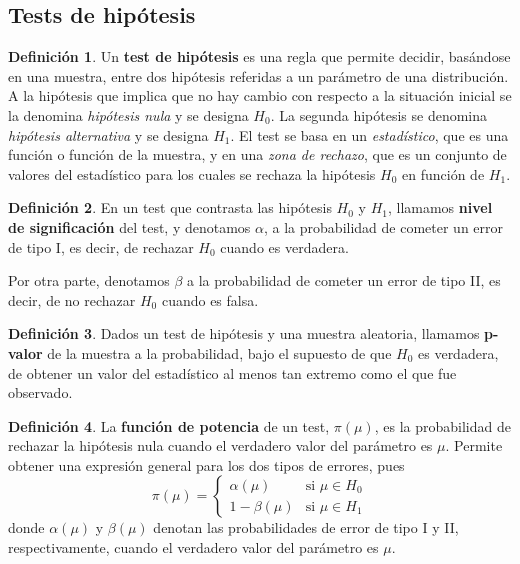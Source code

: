 \documentclass[11pt]{article}
\theoremstyle{plain}
\theoremstyle{definition}
\newtheorem*{defi}{Definición}
\theoremstyle{remark}
\newcommand{\deft}[1]{\textbf{#1}}  %
\begin{document}
  \subsection{Tests de hipótesis}

    \begin{defi}
      Un \deft{test de hipótesis} es una regla que permite decidir, basándose en una muestra, entre dos hipótesis referidas a un parámetro de una distribución. A la hipótesis que implica que no hay cambio con respecto a la situación inicial se la denomina \emph{hipótesis nula} y se designa $H_0$. La segunda hipótesis se denomina \emph{hipótesis alternativa} y se designa $H_1$.
      El test se basa en un \emph{estadístico}, que es una función o función de la muestra, y en una \emph{zona de rechazo}, que es un conjunto de valores del estadístico para los cuales se rechaza la hipótesis $H_0$ en función de $H_1$.
    \end{defi}

    \begin{defi}
      En un test que contrasta las hipótesis $H_0$ y $H_1$, llamamos \deft{nivel de significación} del test, y denotamos $\alpha$, a la probabilidad de cometer un error de tipo I, es decir, de rechazar $H_0$ cuando es verdadera. 

      Por otra parte, denotamos $\beta$ a la probabilidad de cometer un error de tipo II, es decir, de no rechazar $H_0$ cuando es falsa.
    \end{defi}

    \begin{defi}
      Dados un test de hipótesis y una muestra aleatoria, llamamos \deft{p-valor} de la muestra a la probabilidad, bajo el supuesto de que $H_0$ es verdadera, de obtener un valor del estadístico al menos tan extremo como el que fue observado.
    \end{defi}

    \begin{defi}
      La \deft{función de potencia} de un test, $\pi(\mu)$, es la probabilidad de rechazar la hipótesis nula cuando el verdadero valor del parámetro es $\mu$. Permite obtener una expresión general para los dos tipos de errores, pues
      \[ \pi(\mu) = \begin{cases}
      \alpha(\mu) & \text{si $\mu \in H_0$} \\
      1 - \beta(\mu) & \text{si $\mu \in H_1$}
      \end{cases} \]
      donde $\alpha(\mu)$ y $\beta(\mu)$ denotan las probabilidades de error de tipo I y II, respectivamente, cuando el verdadero valor del parámetro es $\mu$.
    \end{defi}
\end{document}
